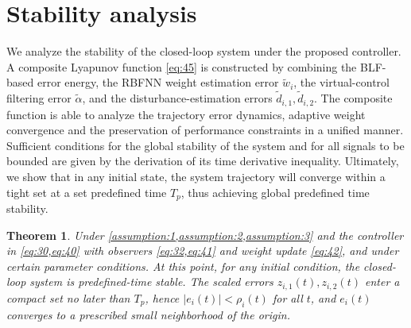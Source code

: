 \documentclass[pdflatex,sn-mathphys-num]{sn-jnl}%
\theoremstyle{thmstyleone}%
\newtheorem{theorem}{Theorem}%
\theoremstyle{thmstyletwo}%
\theoremstyle{thmstylethree}%
\begin{document}


\section{Stability analysis}

 We analyze the stability of the closed-loop system under the proposed controller.  A composite Lyapunov function \cref{eq:45} is constructed by combining the BLF-based error energy, the RBFNN weight estimation error $\tilde w_i$, the virtual-control filtering error $\tilde\alpha$, and the disturbance-estimation errors $\tilde d_{i,1},\tilde d_{i,2}$. The composite function is able to analyze the trajectory error dynamics, adaptive weight convergence and the preservation of performance constraints in a unified manner. Sufficient conditions for the global stability of the system and for all signals to be bounded are given by the derivation of its time derivative inequality. Ultimately, we show that in any initial state, the system trajectory will converge within a tight set at a set predefined time $T_p$, thus achieving global predefined time stability.

 \begin{theorem}
	Under \cref{assumption:1,assumption:2,assumption:3} and the controller in \cref{eq:30,eq:40} with observers \cref{eq:32,eq:41} and weight update \cref{eq:42}, and under certain parameter conditions. At this point, for any initial condition, the closed-loop system is predefined-time stable. The scaled errors $z_{i,1}(t),z_{i,2}(t)$ enter a compact set no later than $T_p$, hence $|e_{i}(t)|<\rho_{i}(t)$ for all $t$, and $e_i(t)$ converges to a prescribed small neighborhood of the origin.
	\end{theorem}
\end{document}
